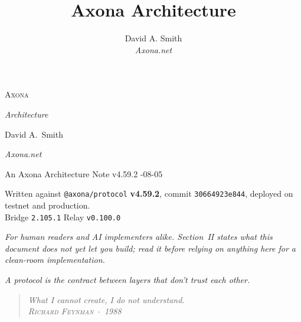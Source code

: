 \documentclass[nobib]{tufte-handout}
\title{Axona Architecture}
\author[David A. Smith]{David A. Smith \\[0.3em] \emph{\small Axona.net}}
\date{}
\begin{document}

\thispagestyle{empty}
\null\vfill
\begin{center}
{\fontsize{48}{52}\selectfont \textsc{Axona}\par}
\vspace{0.6em}
{\Large\itshape Architecture\par}
\vspace{4em}
{\large David A.~Smith\par}
{\itshape\small Axona.net\par}
\vspace{2em}
{\small An Axona Architecture Note \quad v4.59.2 -08-05\par}
\vspace{1.2em}
{\footnotesize
Written against \texttt{@axona/protocol} \textbf{v4.59.2}, commit
\texttt{30664923e844}, deployed on testnet and production.\\
Bridge \texttt{2.105.1} \quad Relay \texttt{v0.100.0}\par}
\vspace{0.8em}
{\footnotesize\itshape
For human readers and AI implementers alike. Section~II states what this
document does \emph{not} yet let you build; read it before relying on
anything here for a clean-room implementation.\par}
\end{center}
\vfill
\null
\newpage

\thispagestyle{empty}
\null\vfill
\begin{flushright}
\itshape A protocol is the contract between layers that don't trust each other.\par
\end{flushright}
\vfill
\null\newpage

\pagestyle{ndhtplain}
\thispagestyle{ndhtplain}
\setcounter{page}{1}

\begin{quote}
  \itshape What I cannot create, I do not understand.\\[0.3em]
  \normalfont\textsc{\footnotesize Richard Feynman} \,$\cdot$\, 1988
\end{quote}
\end{document}
